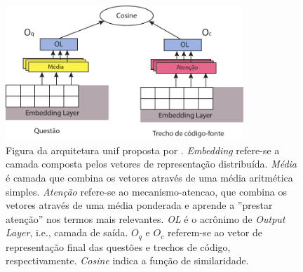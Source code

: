 \begin{figure}[h]
    \centering
    \includegraphics[width=0.8\textwidth]{figuras/cap-experimento/unif-architecture.pdf}
    \caption[Figura da arquitetura \Gls{unif} proposta por \cite{cambronero-deep-learning-code-search:2019}.]{Figura da arquitetura \Gls{unif} proposta por \cite{cambronero-deep-learning-code-search:2019}. \emph{Embedding} refere-se a camada composta pelos vetores de representação distribuída. \emph{Média} é camada que combina os vetores através de uma média aritmética simples. \emph{Atenção} refere-se ao \gls{mecanismo-atencao}, que combina os vetores através de uma média ponderada e aprende a ''prestar atenção'' nos termos mais relevantes. \emph{OL} é o acrônimo de \emph{Output Layer}, i.e., camada de saída. $O_{q}$ e $O_{c}$ referem-se ao vetor de representação final das questões e trechos de código, respectivamente. \emph{Cosine} indica a função de similaridade. }
    \label{fig:unif-architecture}
\end{figure}

